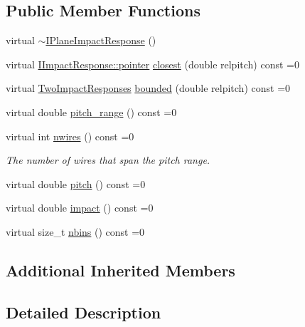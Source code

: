 \subsection*{Public Member Functions}
\begin{DoxyCompactItemize}
\item 
virtual \hyperlink{class_wire_cell_1_1_i_plane_impact_response_a489d57bcf7d07153dcca928ebded32e6}{$\sim$\+I\+Plane\+Impact\+Response} ()
\item 
virtual \hyperlink{class_wire_cell_1_1_interface_a09c548fb8266cfa39afb2e74a4615c37}{I\+Impact\+Response\+::pointer} \hyperlink{class_wire_cell_1_1_i_plane_impact_response_acae9f97e8ec30523c563bd90a66b4eab}{closest} (double relpitch) const =0
\item 
virtual \hyperlink{namespace_wire_cell_ae163f7e69ff1625cf269418b35194d37}{Two\+Impact\+Responses} \hyperlink{class_wire_cell_1_1_i_plane_impact_response_af336a51ac8ccc5df822e10fe1d8275d3}{bounded} (double relpitch) const =0
\item 
virtual double \hyperlink{class_wire_cell_1_1_i_plane_impact_response_a2145d23de537013749fb0cbe822ad7c2}{pitch\+\_\+range} () const =0
\item 
virtual int \hyperlink{class_wire_cell_1_1_i_plane_impact_response_abe58b933a8ba84911d705f46f277b306}{nwires} () const =0
\begin{DoxyCompactList}\small\item\em The number of wires that span the pitch range. \end{DoxyCompactList}\item 
virtual double \hyperlink{class_wire_cell_1_1_i_plane_impact_response_ad8fcf3440976f14b05debbbf6d743d88}{pitch} () const =0
\item 
virtual double \hyperlink{class_wire_cell_1_1_i_plane_impact_response_a3259cbe4883bce2cb4010e0667ec957b}{impact} () const =0
\item 
virtual size\+\_\+t \hyperlink{class_wire_cell_1_1_i_plane_impact_response_acc087884ba0315e588e29398062ed12e}{nbins} () const =0
\end{DoxyCompactItemize}
\subsection*{Additional Inherited Members}


\subsection{Detailed Description}


